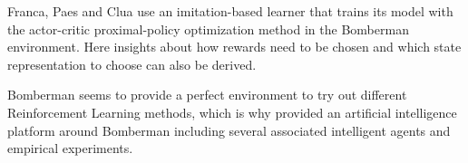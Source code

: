 Franca, Paes and Clua \cite{Franca2019} use an imitation-based learner that trains its model with the actor-critic proximal-policy optimization method in the Bomberman environment. Here insights about how rewards need to be chosen and which state representation to choose can also be derived. 

Bomberman seems to provide a perfect environment to try out different Reinforcement Learning methods, which is why \cite{daCruzLopes2016} provided an artificial intelligence platform around Bomberman including several associated intelligent agents and empirical experiments. 
